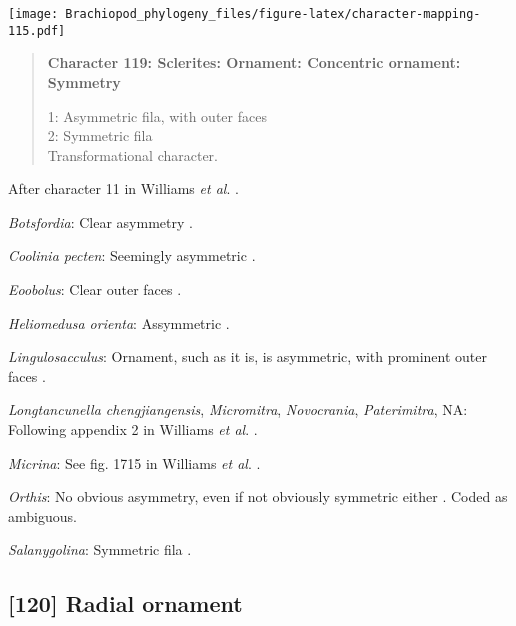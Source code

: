 \documentclass[openany]{book}
\theoremstyle{definition}
\theoremstyle{definition}
\theoremstyle{definition}
\theoremstyle{remark}
\begin{document}
\texttt{[image: Brachiopod\_phylogeny\_files/figure-latex/character-mapping-115.pdf]}

\begin{quote}
\textbf{Character 119: Sclerites: Ornament: Concentric ornament:
Symmetry}

1: Asymmetric fila, with outer faces\\
2: Symmetric fila\\
Transformational character.
\end{quote}

After character 11 in Williams \emph{et al}.
\citeyearpar{Williams1998Thediversity}.

\hypertarget{Botsfordia-coding-119}{}
\emph{Botsfordia}: Clear asymmetry \citep{Skovsted2015Theearly}.

\hypertarget{Coolinia_pecten-coding-119}{}
\emph{Coolinia pecten}: Seemingly asymmetric \citetext{\citealp[fig.
122.3c]{Williams2000LinguliformeaCraniiformea}; \citealp[Fig.
1]{Zhang2011Anobolellate}}.

\hypertarget{Eoobolus-coding-119}{}
\emph{Eoobolus}: Clear outer faces \citep[fig.
100.2b]{Williams2000LinguliformeaCraniiformea}.

\hypertarget{Heliomedusa_orienta-coding-119}{}
\emph{Heliomedusa orienta}: Assymmetric \citep[fig.
3]{Hanken1985Thetaxonomy}.

\hypertarget{Lingulosacculus-coding-119}{}
\emph{Lingulosacculus}: Ornament, such as it is, is asymmetric, with
prominent outer faces \citep{Skovsted2011Scleritomeconstruction}.

\hypertarget{Longtancunella_chengjiangensis-coding-119}{}
\emph{Longtancunella chengjiangensis}, \emph{Micromitra},
\emph{Novocrania}, \emph{Paterimitra}, NA: Following appendix 2 in
Williams \emph{et al}. \citeyearpar{Williams1998Thediversity}.

\hypertarget{Micrina-coding-119}{}
\emph{Micrina}: See fig. 1715 in Williams \emph{et al}.
\citeyearpar{Williams2007Supplement}.

\hypertarget{Orthis-coding-119}{}
\emph{Orthis}: No obvious asymmetry, even if not obviously symmetric
either \citep{Holmer2008TheEarly}. Coded as ambiguous.

\hypertarget{Salanygolina-coding-119}{}
\emph{Salanygolina}: Symmetric fila \citep{Balthasar2004Shellstructure}.

\subsection*{{[}120{]} Radial ornament}\label{radial-ornament}
\end{document}
